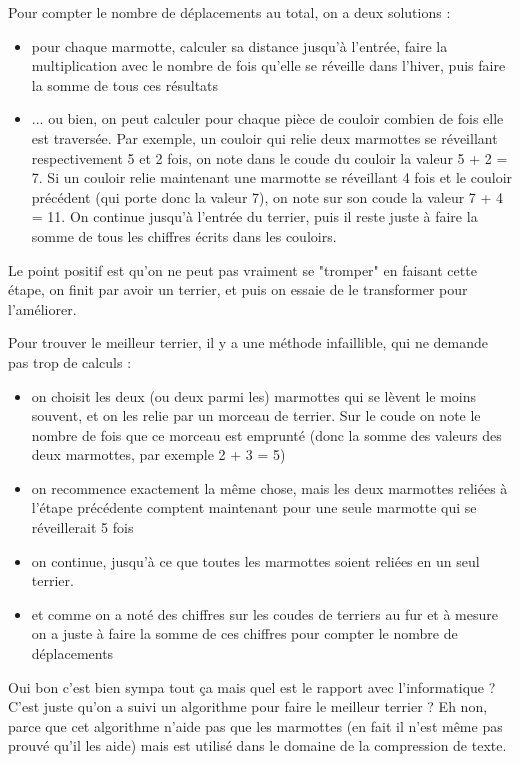 \documentclass[a4paper,10pt]{article}
\begin{document}
Pour compter le nombre de déplacements au total, on a deux solutions :
\begin{itemize}
\item pour chaque marmotte, calculer sa distance jusqu'à l'entrée,
  faire la multiplication avec le nombre de fois qu'elle se réveille
  dans l'hiver, puis faire la somme de tous ces résultats
\item ... ou bien, on peut calculer pour chaque pièce de couloir
  combien de fois elle est traversée. Par exemple, un couloir qui
  relie deux marmottes se réveillant respectivement 5 et 2 fois, on
  note dans le coude du couloir la valeur 5 + 2 = 7. Si un couloir
  relie maintenant une marmotte se réveillant 4 fois et le couloir
  précédent (qui porte donc la valeur 7), on note sur son coude la
  valeur 7 + 4 = 11. On continue jusqu'à l'entrée du terrier, puis il
  reste juste à faire la somme de tous les chiffres écrits dans les couloirs.
\end{itemize}

Le point positif est qu'on ne peut pas vraiment se "tromper" en faisant cette
étape, on finit par avoir un terrier, et puis on essaie de le
transformer pour l'améliorer. 


Pour trouver le meilleur terrier, il y a une méthode infaillible, qui
ne demande pas trop de calculs : 
\begin{itemize}
\item on choisit les deux (ou deux parmi les) marmottes qui se lèvent
  le moins souvent, et on les relie par un morceau de terrier. Sur le
  coude on note le nombre de fois que ce morceau est emprunté (donc la
  somme des valeurs des deux marmottes, par exemple 2 + 3 = 5)
\item on recommence exactement la même chose, mais les deux marmottes
  reliées à l'étape précédente comptent maintenant pour une seule marmotte qui se
  réveillerait 5 fois 
\item on continue, jusqu'à ce que toutes les marmottes soient reliées
  en un seul terrier.
\item et comme on a noté des chiffres sur les coudes de terriers au fur
  et à mesure on a juste à faire la somme de ces chiffres pour compter
  le nombre de déplacements 
\end{itemize}



Oui bon c'est bien sympa tout ça mais quel est le rapport avec
l'informatique ? C'est juste qu'on a suivi un algorithme pour faire le
meilleur terrier ? Eh non, parce que cet algorithme n'aide pas que les
marmottes (en fait il n'est même pas prouvé qu'il les aide) mais est
utilisé dans le domaine de la compression de texte.
\end{document}
